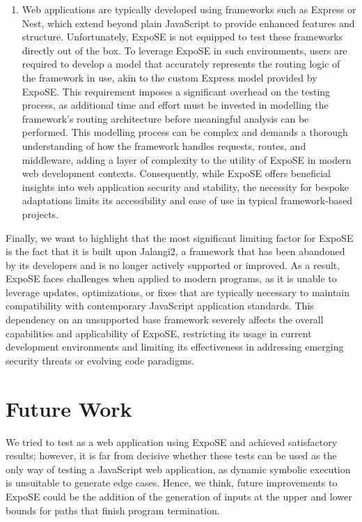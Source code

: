 \begin{enumerate}
    \item Web applications are typically developed using frameworks such as Express or Nest, which extend beyond plain JavaScript to provide enhanced features and structure. Unfortunately, ExpoSE is not equipped to test these frameworks directly out of the box. To leverage ExpoSE in such environments, users are required to develop a model that accurately represents the routing logic of the framework in use, akin to the custom Express model provided by ExpoSE.
    This requirement imposes a significant overhead on the testing process, as additional time and effort must be invested in modelling the framework's routing architecture before meaningful analysis can be performed. This modelling process can be complex and demands a thorough understanding of how the framework handles requests, routes, and middleware, adding a layer of complexity to the utility of ExpoSE in modern web development contexts. Consequently, while ExpoSE offers beneficial insights into web application security and stability, the necessity for bespoke adaptations limits its accessibility and ease of use in typical framework-based projects.

\end{enumerate}

Finally, we want to highlight that the most significant limiting factor for ExpoSE is the fact that it is built upon Jalangi2, a framework that has been abandoned by its developers and is no longer actively supported or improved. As a result, ExpoSE faces challenges when applied to modern programs, as it is unable to leverage updates, optimizations, or fixes that are typically necessary to maintain compatibility with contemporary JavaScript application standards. This dependency on an unsupported base framework severely affects the overall capabilities and applicability of ExpoSE, restricting its usage in current development environments and limiting its effectiveness in addressing emerging security threats or evolving code paradigms.


\section{Future Work}
\label{sec:future-work}

We tried to test as a web application using ExpoSE and achieved satisfactory results; however, it is far from decisive whether these tests can be used as the only way of testing a JavaScript web application, as dynamic symbolic execution is unsuitable to generate edge cases. Hence, we think, future improvements to ExpoSE could be the addition of the generation of inputs at the upper and lower bounds for paths that finish program termination.

